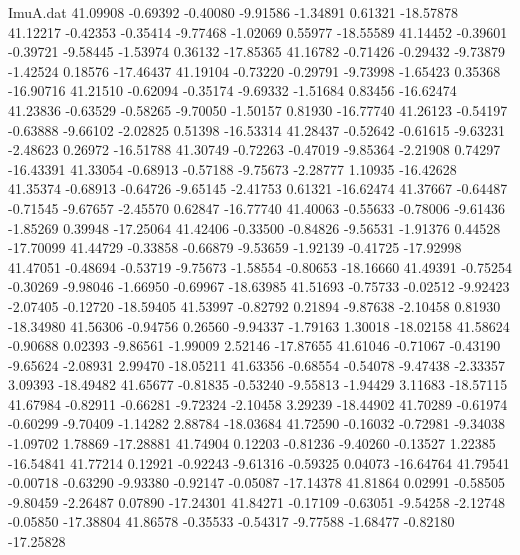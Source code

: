 \begin{filecontents}{ImuA.dat}
  41.09908   -0.69392   -0.40080   -9.91586   -1.34891    0.61321  -18.57878
  41.12217   -0.42353   -0.35414   -9.77468   -1.02069    0.55977  -18.55589
  41.14452   -0.39601   -0.39721   -9.58445   -1.53974    0.36132  -17.85365
  41.16782   -0.71426   -0.29432   -9.73879   -1.42524    0.18576  -17.46437
  41.19104   -0.73220   -0.29791   -9.73998   -1.65423    0.35368  -16.90716
  41.21510   -0.62094   -0.35174   -9.69332   -1.51684    0.83456  -16.62474
  41.23836   -0.63529   -0.58265   -9.70050   -1.50157    0.81930  -16.77740
  41.26123   -0.54197   -0.63888   -9.66102   -2.02825    0.51398  -16.53314
  41.28437   -0.52642   -0.61615   -9.63231   -2.48623    0.26972  -16.51788
  41.30749   -0.72263   -0.47019   -9.85364   -2.21908    0.74297  -16.43391
  41.33054   -0.68913   -0.57188   -9.75673   -2.28777    1.10935  -16.42628
  41.35374   -0.68913   -0.64726   -9.65145   -2.41753    0.61321  -16.62474
  41.37667   -0.64487   -0.71545   -9.67657   -2.45570    0.62847  -16.77740
  41.40063   -0.55633   -0.78006   -9.61436   -1.85269    0.39948  -17.25064
  41.42406   -0.33500   -0.84826   -9.56531   -1.91376    0.44528  -17.70099
  41.44729   -0.33858   -0.66879   -9.53659   -1.92139   -0.41725  -17.92998
  41.47051   -0.48694   -0.53719   -9.75673   -1.58554   -0.80653  -18.16660
  41.49391   -0.75254   -0.30269   -9.98046   -1.66950   -0.69967  -18.63985
  41.51693   -0.75733   -0.02512   -9.92423   -2.07405   -0.12720  -18.59405
  41.53997   -0.82792    0.21894   -9.87638   -2.10458    0.81930  -18.34980
  41.56306   -0.94756    0.26560   -9.94337   -1.79163    1.30018  -18.02158
  41.58624   -0.90688    0.02393   -9.86561   -1.99009    2.52146  -17.87655
  41.61046   -0.71067   -0.43190   -9.65624   -2.08931    2.99470  -18.05211
  41.63356   -0.68554   -0.54078   -9.47438   -2.33357    3.09393  -18.49482
  41.65677   -0.81835   -0.53240   -9.55813   -1.94429    3.11683  -18.57115
  41.67984   -0.82911   -0.66281   -9.72324   -2.10458    3.29239  -18.44902
  41.70289   -0.61974   -0.60299   -9.70409   -1.14282    2.88784  -18.03684
  41.72590   -0.16032   -0.72981   -9.34038   -1.09702    1.78869  -17.28881
  41.74904    0.12203   -0.81236   -9.40260   -0.13527    1.22385  -16.54841
  41.77214    0.12921   -0.92243   -9.61316   -0.59325    0.04073  -16.64764
  41.79541   -0.00718   -0.63290   -9.93380   -0.92147   -0.05087  -17.14378
  41.81864    0.02991   -0.58505   -9.80459   -2.26487    0.07890  -17.24301
  41.84271   -0.17109   -0.63051   -9.54258   -2.12748   -0.05850  -17.38804
  41.86578   -0.35533   -0.54317   -9.77588   -1.68477   -0.82180  -17.25828

\end{filecontents}
